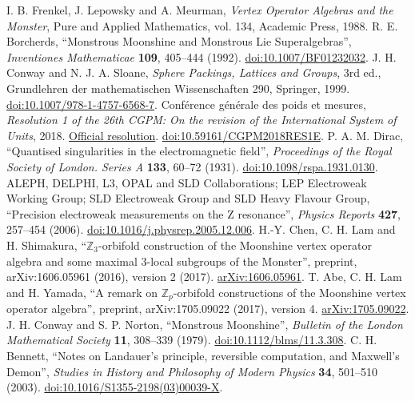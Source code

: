  I. B. Frenkel, J. Lepowsky and A. Meurman, \emph{Vertex Operator Algebras and the Monster}, Pure and Applied Mathematics, vol. 134, Academic Press, 1988.
 R. E. Borcherds, ``Monstrous Moonshine and Monstrous Lie Superalgebras'', \emph{Inventiones Mathematicae} \textbf{109}, 405--444 (1992). \href{https://doi.org/10.1007/BF01232032}{doi:10.1007/BF01232032}.
 J. H. Conway and N. J. A. Sloane, \emph{Sphere Packings, Lattices and Groups}, 3rd ed., Grundlehren der mathematischen Wissenschaften 290, Springer, 1999. \href{https://doi.org/10.1007/978-1-4757-6568-7}{doi:10.1007/978-1-4757-6568-7}.
 Conférence générale des poids et mesures, \emph{Resolution 1 of the 26th CGPM: On the revision of the International System of Units}, 2018. \href{https://www.bipm.org/en/committees/cg/cgpm/26-2018/resolution-1}{Official resolution}. \href{https://doi.org/10.59161/CGPM2018RES1E}{doi:10.59161/CGPM2018RES1E}.
 P. A. M. Dirac, ``Quantised singularities in the electromagnetic field'', \emph{Proceedings of the Royal Society of London. Series A} \textbf{133}, 60--72 (1931). \href{https://doi.org/10.1098/rspa.1931.0130}{doi:10.1098/rspa.1931.0130}.
 ALEPH, DELPHI, L3, OPAL and SLD Collaborations; LEP Electroweak Working Group; SLD Electroweak Group and SLD Heavy Flavour Group, ``Precision electroweak measurements on the Z resonance'', \emph{Physics Reports} \textbf{427}, 257--454 (2006). \href{https://doi.org/10.1016/j.physrep.2005.12.006}{doi:10.1016/j.physrep.2005.12.006}.
 H.-Y. Chen, C. H. Lam and H. Shimakura, ``\(\mathbb Z_3\)-orbifold construction of the Moonshine vertex operator algebra and some maximal \(3\)-local subgroups of the Monster'', preprint, arXiv:1606.05961 (2016), version 2 (2017). \href{https://arxiv.org/abs/1606.05961}{arXiv:1606.05961}.
 T. Abe, C. H. Lam and H. Yamada, ``A remark on \(\mathbb Z_p\)-orbifold constructions of the Moonshine vertex operator algebra'', preprint, arXiv:1705.09022 (2017), version 4. \href{https://arxiv.org/abs/1705.09022v4}{arXiv:1705.09022}.
 J. H. Conway and S. P. Norton, ``Monstrous Moonshine'', \emph{Bulletin of the London Mathematical Society} \textbf{11}, 308--339 (1979). \href{https://doi.org/10.1112/blms/11.3.308}{doi:10.1112/blms/11.3.308}.
 C. H. Bennett, ``Notes on Landauer's principle, reversible computation, and Maxwell's Demon'', \emph{Studies in History and Philosophy of Modern Physics} \textbf{34}, 501--510 (2003). \href{https://doi.org/10.1016/S1355-2198(03)00039-X}{doi:10.1016/S1355-2198(03)00039-X}.
